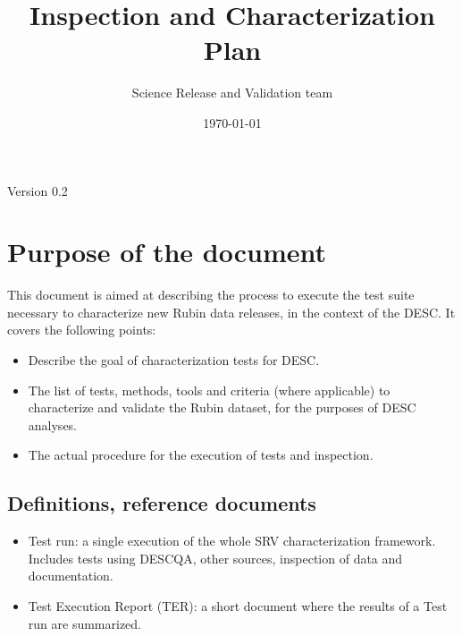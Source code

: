 \documentclass[12pt, a4paper]{article}
\title{Inspection and Characterization Plan} %
\author{Science Release and Validation team} %
\date{\today} %
\begin{document}
\maketitle %

\begin{center}
Version 0.2
\end{center}



\section{Purpose of the document}

This document is aimed at describing the process to execute the test suite necessary to characterize new Rubin data releases, in the context of the DESC. It covers the following points:

\begin{itemize}
\item Describe the goal of characterization tests for DESC.
\item The list of tests, methods, tools and criteria (where applicable) to characterize and validate the Rubin dataset, for the purposes of DESC analyses.
\item The actual procedure for the execution of tests and inspection.
\end{itemize}


\subsection{Definitions, reference documents}

\begin{itemize}
\item Test run: a single execution of the whole SRV characterization framework. Includes tests using DESCQA, other sources, inspection of data and documentation.
\item Test Execution Report (TER): a short document where the results of a Test run are summarized.
\end{itemize}
 
\end{document}
